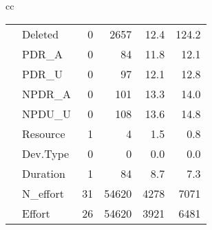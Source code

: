 \begin{table*}[t!]
\begin{tabular}{cc}
\begin{tabular}{|c|l|rrrr|}
& Deleted & 0 & 2657 & 12.4 & 124.2\\
& PDR\_A & 0 & 84 & 11.8 & 12.1\\
& PDR\_U & 0 & 97 & 12.1 & 12.8\\
& NPDR\_A & 0 & 101 & 13.3 & 14.0\\
& NPDU\_U & 0 & 108 & 13.6 & 14.8\\
& Resource & 1 & 4 & 1.5 & 0.8\\
& Dev.Type & 0 & 0 & 0.0 & 0.0\\
& Duration & 1 & 84 & 8.7 & 7.3\\
& N\_effort & 31 & 54620 & 4278 & 7071\\
& Effort & 26 & 54620 & 3921 & 6481\\
\hline

\end{tabular}




\end{tabular}
\end{table*}
